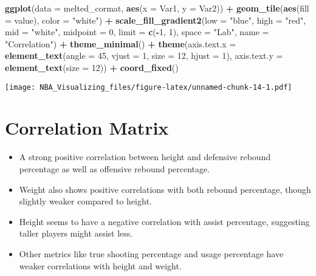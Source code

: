 \documentclass[
]{book}
\newenvironment{Shaded}{\begin{snugshade}}{\end{snugshade}}
\newcommand{\AttributeTok}[1]{\textcolor[rgb]{0.13,0.29,0.53}{#1}}
\newcommand{\DecValTok}[1]{\textcolor[rgb]{0.00,0.00,0.81}{#1}}
\newcommand{\FunctionTok}[1]{\textcolor[rgb]{0.13,0.29,0.53}{\textbf{#1}}}
\newcommand{\NormalTok}[1]{#1}
\newcommand{\SpecialCharTok}[1]{\textcolor[rgb]{0.81,0.36,0.00}{\textbf{#1}}}
\newcommand{\StringTok}[1]{\textcolor[rgb]{0.31,0.60,0.02}{#1}}
\providecommand{\tightlist}{%
  \setlength{\itemsep}{0pt}\setlength{\parskip}{0pt}}
\begin{document}
\begin{Shaded}
\begin{Highlighting}[]
\FunctionTok{ggplot}\NormalTok{(}\AttributeTok{data =}\NormalTok{ melted\_cormat, }\FunctionTok{aes}\NormalTok{(}\AttributeTok{x =}\NormalTok{ Var1,}
    \AttributeTok{y =}\NormalTok{ Var2)) }\SpecialCharTok{+} \FunctionTok{geom\_tile}\NormalTok{(}\FunctionTok{aes}\NormalTok{(}\AttributeTok{fill =}\NormalTok{ value),}
    \AttributeTok{color =} \StringTok{"white"}\NormalTok{) }\SpecialCharTok{+} \FunctionTok{scale\_fill\_gradient2}\NormalTok{(}\AttributeTok{low =} \StringTok{"blue"}\NormalTok{,}
    \AttributeTok{high =} \StringTok{"red"}\NormalTok{, }\AttributeTok{mid =} \StringTok{"white"}\NormalTok{, }\AttributeTok{midpoint =} \DecValTok{0}\NormalTok{,}
    \AttributeTok{limit =} \FunctionTok{c}\NormalTok{(}\SpecialCharTok{{-}}\DecValTok{1}\NormalTok{, }\DecValTok{1}\NormalTok{), }\AttributeTok{space =} \StringTok{"Lab"}\NormalTok{, }\AttributeTok{name =} \StringTok{"Correlation"}\NormalTok{) }\SpecialCharTok{+}
    \FunctionTok{theme\_minimal}\NormalTok{() }\SpecialCharTok{+} \FunctionTok{theme}\NormalTok{(}\AttributeTok{axis.text.x =} \FunctionTok{element\_text}\NormalTok{(}\AttributeTok{angle =} \DecValTok{45}\NormalTok{,}
    \AttributeTok{vjust =} \DecValTok{1}\NormalTok{, }\AttributeTok{size =} \DecValTok{12}\NormalTok{, }\AttributeTok{hjust =} \DecValTok{1}\NormalTok{), }\AttributeTok{axis.text.y =} \FunctionTok{element\_text}\NormalTok{(}\AttributeTok{size =} \DecValTok{12}\NormalTok{)) }\SpecialCharTok{+}
    \FunctionTok{coord\_fixed}\NormalTok{()}
\end{Highlighting}
\end{Shaded}

\texttt{[image: NBA\_Visualizing\_files/figure-latex/unnamed-chunk-14-1.pdf]}

\hypertarget{correlation-matrix}{%
\section{Correlation Matrix}\label{correlation-matrix}}

\begin{itemize}
\tightlist
\item
  A strong positive correlation between height and defensive rebound percentage as well as offensive rebound percentage.
\item
  Weight also shows positive correlations with both rebound percentage, though slightly weaker compared to height.
\item
  Height seems to have a negative correlation with assist percentage, suggesting taller players might assist less.
\item
  Other metrics like true shooting percentage and usage percentage have weaker correlations with height and weight.
\end{itemize}
\end{document}
